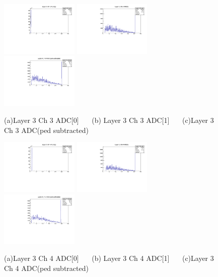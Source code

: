 \documentclass[a4paper,11pt]{article}
\theoremstyle{mytheor}
\begin{document}
\clearpage 
\begin{figure}[H] 
\vspace*{-0.3cm} 
\includegraphics[width=0.33\textwidth,scale=0.5,trim=0 0 0 0,clip]{plotsdir/file0_test-Layer3_Ch3_adc0-1.pdf} 
\includegraphics[width=0.33\textwidth,scale=0.5,trim=0 0 0 0,clip]{plotsdir/file0_test-Layer3_Ch3_adc1-1.pdf} 
\includegraphics[width=0.33\textwidth,scale=0.5,trim=0 0 0 0,clip]{plotsdir/file0_test-Layer3_Ch3_adcPedsub-1.pdf} 
\caption{(a)Layer 3 Ch 3 ADC[0] ~~~(b) Layer 3 Ch 3 ADC[1] ~~~(c)Layer 3 Ch 3 ADC(ped subtracted) } 
\end{figure} 
\begin{figure}[H] 
\vspace*{-0.3cm} 
\includegraphics[width=0.33\textwidth,scale=0.5,trim=0 0 0 0,clip]{plotsdir/file0_test-Layer3_Ch4_adc0-1.pdf} 
\includegraphics[width=0.33\textwidth,scale=0.5,trim=0 0 0 0,clip]{plotsdir/file0_test-Layer3_Ch4_adc1-1.pdf} 
\includegraphics[width=0.33\textwidth,scale=0.5,trim=0 0 0 0,clip]{plotsdir/file0_test-Layer3_Ch4_adcPedsub-1.pdf} 
\caption{(a)Layer 3 Ch 4 ADC[0] ~~~(b) Layer 3 Ch 4 ADC[1] ~~~(c)Layer 3 Ch 4 ADC(ped subtracted) } 
\end{figure} 
\end{document}
